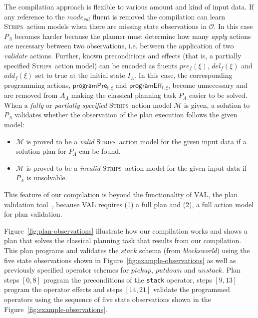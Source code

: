 \documentclass[3p,times]{elsarticle}
\newcommand{\strips}{\textsc{Strips}}     %
\begin{document}
The compilation approach is flexible to various amount and kind of input data. If any reference to the $mode_{val}$ fluent is removed the compilation can learn \strips\ action models when there are missing state observations in $\mathcal{O}$. In this case $P_{\Lambda}$ becomes harder because the planner must determine how many {\em apply} actions are necessary between two observations, i.e. between the application of two {\em validate} actions.  Further, known preconditions and effects (that is, a partially specified \strips\ action model) can be encoded as fluents $pre_f(\xi)$, $del_f(\xi)$ and $add_f(\xi)$ set to true at the initial state $I_{\Lambda}$. In this case, the corresponding programming actions, $\mathsf{programPre_{f,\xi}}$ and $\mathsf{programEff_{f,\xi}}$, become unnecessary and are removed from $A_{\Lambda}$ making the classical planning task $P_{\Lambda}$ easier to be solved. When a {\em fully} or {\em partially specified} \strips\ action model $\mathcal{M}$ is given, a solution to $P_{\Lambda}$ validates whether the observation of the plan execution follows the given model:
\begin{itemize}
\item $\mathcal{M}$ is proved to be a {\em valid} \strips\ action model for the given input data if a solution plan for $P_{\Lambda}$ can be found.
\item $\mathcal{M}$ is proved to be a {\em invalid} \strips\ action model for the given input data if $P_{\Lambda}$ is unsolvable. 
\end{itemize}
This feature of our compilation is beyond the functionality of VAL, the plan validation tool~\cite{howey2004val}, because VAL requires (1) a full plan and (2), a full action model for plan validation.

Figure~\ref{fig:plan-observations} illustrate how our compilation works and shows a plan that solves the classical planning task that results from our compilation. This plan programs and validates the $stack$ schema (from {\em blocksworld}) using the five state observations shown in Figure~\ref{fig:example-observations} as well as previously specified operator schemes for $pickup$, $putdown$ and $unstack$. Plan steps $[0,8]$ program the preconditions of the {\tt\small stack} operator, steps $[9,13]$ program the operator effects and steps $[14,21]$ validate the programmed operators using the sequence of five state observations shown in the Figure~\ref{fig:example-observations}.
\end{document}
